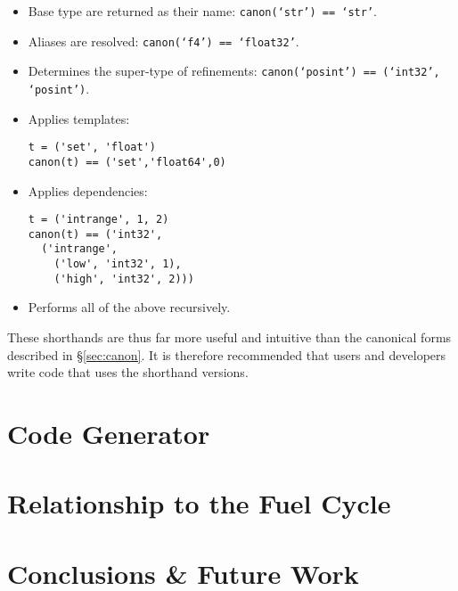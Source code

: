 \documentclass{ansconfpaper}
\newcommand{\vin}[1]{\texttt{{#1}}}
\begin{document}
\begin{itemize}
\item Base type are returned as their name: \vin{canon(`str') == `str'}.

\item Aliases are resolved: \vin{canon(`f4') == `float32'}.

\item Determines the super-type of refinements: \vin{canon(`posint') == 
    (`int32', `posint')}.

\item Applies templates:
\begin{lstlisting}
t = ('set', 'float')
canon(t) == ('set','float64',0)
\end{lstlisting}

\item Applies dependencies:
\begin{lstlisting}    
t = ('intrange', 1, 2)
canon(t) == ('int32', 
  ('intrange', 
    ('low', 'int32', 1), 
    ('high', 'int32', 2)))
\end{lstlisting}

\item Performs all of the above recursively.
\end{itemize}

These shorthands are thus far more useful and intuitive than the canonical forms 
described in \S \ref{sec:canon}.  It is therefore recommended that users and 
developers write code that uses the shorthand versions.

\section{Code Generator}
\label{sec:codegen}

\section{Relationship to the Fuel Cycle}
\label{sec:fc}

\section{Conclusions \& Future Work}
\label{sec:conc}


\setlength{\baselineskip}{12pt}



\end{document}
